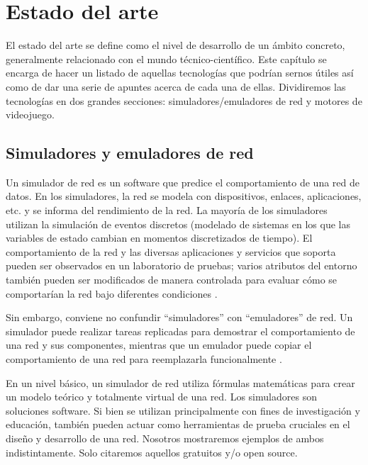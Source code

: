 \chapter{Estado del arte}\label{chap:ArtState}

El estado del arte se define como el nivel de desarrollo de un ámbito concreto, generalmente relacionado con el mundo técnico-científico. Este capítulo se encarga de hacer un listado de aquellas tecnologías que podrían sernos útiles así como de dar una serie de apuntes acerca de cada una de ellas. Dividiremos las tecnologías en dos grandes secciones: simuladores/emuladores de red y motores de videojuego.

\section{Simuladores y emuladores de red}\label{sec:simuladoremulador}
Un simulador de red es un software que predice el comportamiento de una red de datos. En los simuladores, la red se modela con dispositivos, enlaces, aplicaciones, etc. y se informa del rendimiento de la red. La mayoría de los simuladores utilizan la simulación de eventos discretos (modelado de sistemas en los que las variables de estado cambian en momentos discretizados de tiempo). El comportamiento de la red y las diversas aplicaciones y servicios que soporta pueden ser observados en un laboratorio de pruebas; varios atributos del entorno también pueden ser modificados de manera controlada para evaluar cómo se comportarían la red bajo diferentes condiciones \cite{wiki:Network_simulation}.

Sin embargo, conviene no confundir ``simuladores'' con ``emuladores'' de red. Un simulador puede realizar tareas replicadas para demostrar el comportamiento de una red y sus componentes, mientras que un emulador puede copiar el comportamiento de una red para reemplazarla funcionalmente \cite{emsim}.

En un nivel básico, un simulador de red utiliza fórmulas matemáticas para crear un modelo teórico y totalmente virtual de una red. Los simuladores son soluciones software. Si bien se utilizan principalmente con fines de investigación y educación, también pueden actuar como herramientas de prueba cruciales en el diseño y desarrollo de una red. Nosotros mostraremos ejemplos de ambos indistintamente. Solo citaremos aquellos gratuitos y/o open source.


